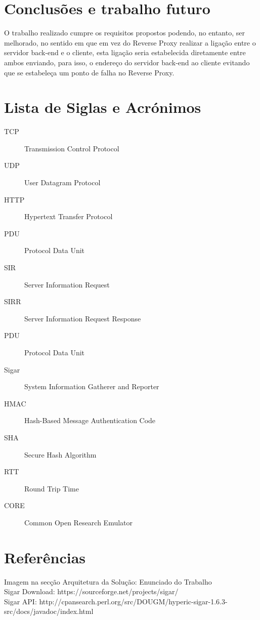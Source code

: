 \documentclass{article}
\begin{document}
\section{Conclusões e trabalho futuro}
O trabalho realizado cumpre os requisitos propostos podendo, no entanto, ser melhorado, no sentido em que em vez do Reverse Proxy realizar a ligação entre o servidor back-end e o cliente, esta ligação seria estabelecida diretamente entre ambos enviando, para isso, o endereço do servidor back-end ao cliente evitando que se estabeleça um ponto de falha no Reverse Proxy.

\section{Lista de Siglas e Acrónimos}
\begin{description}
    \item [TCP] Transmission Control Protocol
    \item [UDP] User Datagram Protocol
    \item [HTTP] Hypertext Transfer Protocol
    \item [PDU] Protocol Data Unit
    \item [SIR] Server Information Request
    \item [SIRR] Server Information Request Response
    \item [PDU] Protocol Data Unit
    \item [Sigar] System Information Gatherer and Reporter
    \item [HMAC] Hash-Based Message Authentication Code
    \item [SHA] Secure Hash Algorithm
    \item [RTT] Round Trip Time
    \item [CORE] Common Open Research Emulator
\end{description}

\section{Referências}
Imagem na secção Arquitetura da Solução: Enunciado do Trabalho\\
Sigar Download: https://sourceforge.net/projects/sigar/\\
Sigar API: http://cpansearch.perl.org/src/DOUGM/hyperic-sigar-1.6.3-src/docs/javadoc/index.html\\
\end{document}
